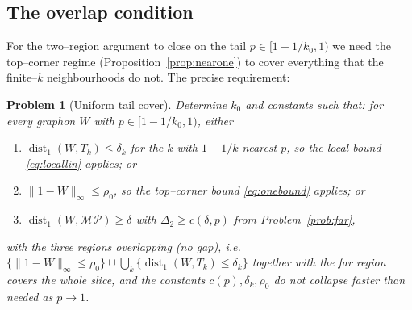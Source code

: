 \documentclass[11pt]{article}
\newtheorem{problem}[theorem]{Problem}
\theoremstyle{definition}
\newcommand{\dist}{\operatorname{dist}}
\newcommand{\MP}{\mathcal{MP}}
\newcommand{\Tk}{T_k}
\newcommand{\Linf}[1]{\lVert #1\rVert_\infty}
\begin{document}
\subsection{The overlap condition}

For the two--region argument to close on the tail $p\in[1-1/k_0,1)$ we need the
top--corner regime (Proposition~\ref{prop:nearone}) to cover everything that the
finite--$k$ neighbourhoods do not.  The precise requirement:

\begin{problem}[Uniform tail cover]\label{prob:tail}
Determine $k_0$ and constants such that: for every graphon $W$ with
$p\in[1-1/k_0,1)$, \emph{either}
\begin{enumerate}[label=\textup{(\roman*)}]
\item $\dist_1(W,\Tk)\le\delta_k$ for the $k$ with $1-1/k$ nearest $p$, so the
local bound \eqref{eq:locallin} applies; \emph{or}
\item $\Linf{1-W}\le\rho_0$, so the top--corner bound \eqref{eq:onebound} applies;
\emph{or}
\item $\dist_1(W,\MP)\ge\delta$ with $\Delta_2\ge c(\delta,p)$ from
Problem~\ref{prob:far},
\end{enumerate}
\emph{with the three regions overlapping} (no gap), i.e.\
$\{\Linf{1-W}\le\rho_0\}\cup\bigcup_k\{\dist_1(W,\Tk)\le\delta_k\}$ together with
the far region covers the whole slice, and the constants $c(p),\delta_k,\rho_0$ do
not collapse faster than needed as $p\to1$.
\end{problem}
\end{document}
